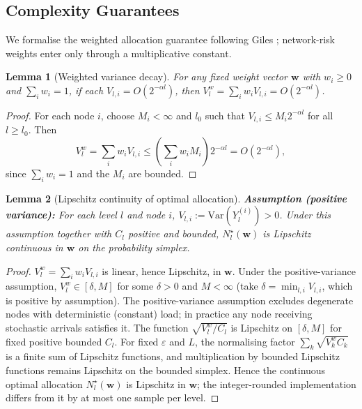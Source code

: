 \documentclass{ieeeaccess}
\newtheorem{lemma}{Lemma}
\begin{document}
\subsection{Complexity Guarantees}
\label{subsec:complexity}

We formalise the weighted allocation guarantee following Giles \cite{giles2015multilevel};
network-risk weights enter only through a multiplicative constant.

\begin{lemma}[Weighted variance decay]
\label{lem:weighted_variance}
For any fixed weight vector $\mathbf{w}$ with $w_i \geq 0$ and $\sum_i w_i = 1$, if each
$V_{l,i}=O(2^{-\alpha l})$, then
$V_l^w=\sum_i w_i V_{l,i}=O(2^{-\alpha l})$.
\end{lemma}
\begin{proof}
For each node $i$, choose $M_i<\infty$ and $l_0$ such that
$V_{l,i}\leq M_i2^{-\alpha l}$ for all $l\geq l_0$. Then
\[
V_l^w=\sum_i w_i V_{l,i}
\leq \left(\sum_i w_i M_i\right)2^{-\alpha l}
=O(2^{-\alpha l}),
\]
since $\sum_i w_i=1$ and the $M_i$ are bounded.
\end{proof}

\begin{lemma}[Lipschitz continuity of optimal allocation]
\label{lem:lipschitz_allocation}
\textbf{Assumption (positive variance):} For each level $l$ and node $i$,
$V_{l,i} := \mathrm{Var}(Y_l^{(i)}) > 0$.
Under this assumption together with $C_l$ positive and bounded,
$N_l^\star(\mathbf{w})$ is Lipschitz continuous in $\mathbf{w}$ on the probability simplex.
\end{lemma}
\begin{proof}
$V_l^w=\sum_i w_i V_{l,i}$ is linear, hence Lipschitz, in $\mathbf{w}$. Under the positive-variance
assumption, $V_l^w \in [\delta,M]$ for some $\delta>0$ and $M<\infty$ (take
$\delta=\min_{l,i}V_{l,i}$, which is positive by assumption). The positive-variance assumption
excludes degenerate nodes with deterministic (constant) load; in practice any node receiving
stochastic arrivals satisfies it. The function $\sqrt{V_l^w/C_l}$ is Lipschitz on
$[\delta,M]$ for fixed positive bounded $C_l$. For fixed $\varepsilon$ and $L$, the normalising
factor $\sum_k\sqrt{V_k^w C_k}$ is a finite sum of Lipschitz functions, and multiplication by
bounded Lipschitz functions remains Lipschitz on the bounded simplex. Hence the continuous
optimal allocation $N_l^\star(\mathbf{w})$ is Lipschitz in $\mathbf{w}$; the integer-rounded implementation differs
from it by at most one sample per level.
\end{proof}
\end{document}
